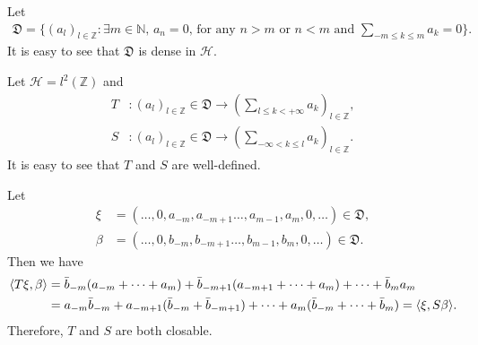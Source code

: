 \documentclass[a4paper,10pt]{amsart}
\newcommand{\HHH}{\mathcal H} %
\newcommand{\DDD}{\mathfrak D}
\newcommand{\Z}{\mathbb Z} %
\newcommand{\N}{\mathbb N} %
\begin{document}
Let
\begin{align*}
    \DDD = \{(a_l)_{l \in \Z} : \mbox{$\exists m \in \N$, $a_n = 0$,
            for any $n > m$ or $n < m$ and 
$\sum_{-m \leq k \leq m}a_{k} = 0$}\}. 
\end{align*}
It is easy to see that $\DDD$ is dense in $\HHH$.

Let $\HHH = l^{2}(\Z)$ and 
\begin{align*}
    T &: (a_l)_{l \in \Z} \in \DDD \to 
    (\sum_{l \leq k <+\infty} a_k)_{l \in \Z},\\
    S &: (a_l)_{l \in \Z} \in \DDD \to 
    (\sum_{-\infty < k \leq l}a_k)_{l \in \Z}.
\end{align*}
It is easy to see that $T$ and $S$ are well-defined. 

Let 
\begin{align*}
\xi &= (\ldots, 0, a_{-m}, a_{-m+1} \ldots, a_{m-1}, a_{m}, 0, \ldots) 
\in \DDD, \\  
\beta &= (\ldots, 0, b_{-m}, b_{-m+1} \ldots, b_{m-1}, b_{m}, 0, \ldots)
\in \DDD.
\end{align*}
Then we have
\begin{align*}
    \langle T\xi, \beta \rangle &= \Bar{b}_{-m}(a_{-m} + \cdots + a_{m})
    + \Bar{b}_{-m+1}(a_{-m+1} + \cdots + a_{m}) + \cdots + 
    \Bar{b}_{m}a_m \\
    & = a_{-m}\Bar{b}_{-m} + a_{-m+1}(\Bar{b}_{-m} + \Bar{b}_{-m+1}) 
    + \cdots + 
    a_{m}(\Bar{b}_{-m} + \cdots + \Bar{b}_{m}) = 
    \langle \xi, S\beta \rangle.
\end{align*}
Therefore, $T$ and $S$ are both closable.
\end{document}
